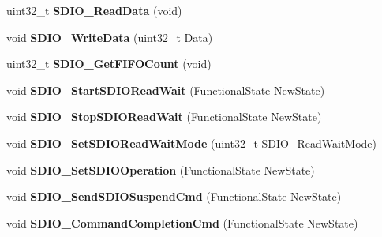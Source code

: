 \begin{DoxyCompactItemize}
\item 
\hypertarget{group__SDIO__Exported__Functions_ga4e8ac755ef3c31ecd4ed2708df19187e}{
uint32\_\-t {\bfseries SDIO\_\-ReadData} (void)}
\label{group__SDIO__Exported__Functions_ga4e8ac755ef3c31ecd4ed2708df19187e}

\item 
\hypertarget{group__SDIO__Exported__Functions_ga361008b5252aa33b5f2b5823ee3d7240}{
void {\bfseries SDIO\_\-WriteData} (uint32\_\-t Data)}
\label{group__SDIO__Exported__Functions_ga361008b5252aa33b5f2b5823ee3d7240}

\item 
\hypertarget{group__SDIO__Exported__Functions_ga9a3343983a2d68b5164a1c89797d2dd6}{
uint32\_\-t {\bfseries SDIO\_\-GetFIFOCount} (void)}
\label{group__SDIO__Exported__Functions_ga9a3343983a2d68b5164a1c89797d2dd6}

\item 
\hypertarget{group__SDIO__Exported__Functions_gac88f914d9a68a83abc2265ec8a7b79fc}{
void {\bfseries SDIO\_\-StartSDIOReadWait} (FunctionalState NewState)}
\label{group__SDIO__Exported__Functions_gac88f914d9a68a83abc2265ec8a7b79fc}

\item 
\hypertarget{group__SDIO__Exported__Functions_gaca6b25eb2debb73ac827c66f0ebcf837}{
void {\bfseries SDIO\_\-StopSDIOReadWait} (FunctionalState NewState)}
\label{group__SDIO__Exported__Functions_gaca6b25eb2debb73ac827c66f0ebcf837}

\item 
\hypertarget{group__SDIO__Exported__Functions_ga2baac4ea1bb6c2d94345d2712604338a}{
void {\bfseries SDIO\_\-SetSDIOReadWaitMode} (uint32\_\-t SDIO\_\-ReadWaitMode)}
\label{group__SDIO__Exported__Functions_ga2baac4ea1bb6c2d94345d2712604338a}

\item 
\hypertarget{group__SDIO__Exported__Functions_ga24e210c185d5a7855cbaff4472a8f8d1}{
void {\bfseries SDIO\_\-SetSDIOOperation} (FunctionalState NewState)}
\label{group__SDIO__Exported__Functions_ga24e210c185d5a7855cbaff4472a8f8d1}

\item 
\hypertarget{group__SDIO__Exported__Functions_ga9264137a01a1ab81d03bc80a3b3120fc}{
void {\bfseries SDIO\_\-SendSDIOSuspendCmd} (FunctionalState NewState)}
\label{group__SDIO__Exported__Functions_ga9264137a01a1ab81d03bc80a3b3120fc}

\item 
\hypertarget{group__SDIO__Exported__Functions_ga1bbe98c629812bc62121d9c8b2c5e21b}{
void {\bfseries SDIO\_\-CommandCompletionCmd} (FunctionalState NewState)}
\label{group__SDIO__Exported__Functions_ga1bbe98c629812bc62121d9c8b2c5e21b}


\end{DoxyCompactItemize}
